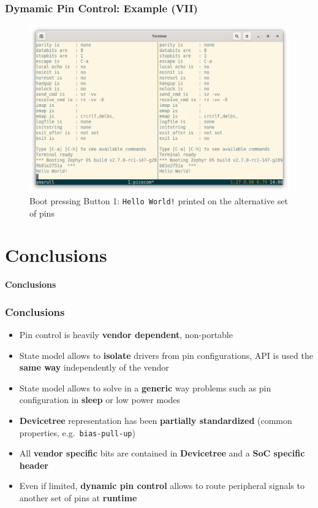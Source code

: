 \documentclass[handout]{beamer}
\begin{document}
\begin{frame}
  \frametitle{Dymamic Pin Control: Example (VII)}

  \begin{figure}
    \centering
    \includegraphics[scale=0.2]{terminals-alt.png}
    \caption{Boot pressing Button 1: \texttt{Hello World!} printed on
      the alternative set of pins}
  \end{figure}
\end{frame}


\section{Conclusions}

\begin{frame}
  \begin{center}
    \Huge
    \textbf{Conclusions}
  \end{center}
\end{frame}

\begin{frame}
  \frametitle{Conclusions}

  \begin{itemize}
    \item<1-> Pin control is heavily \textbf{vendor dependent}, non-portable
    \item<2-> State model allows to \textbf{isolate} drivers from pin
          configurations, API is used the \textbf{same way} independently of the
          vendor
    \item<3-> State model allows to solve in a \textbf{generic} way problems
          such as pin configuration in \textbf{sleep} or low power modes
    \item<4-> \textbf{Devicetree} representation has been
          \textbf{partially standardized} (common properties,
          e.g.\ \texttt{bias-pull-up})
    \item<5-> All \textbf{vendor specific} bits are contained in
          \textbf{Devicetree} and a \textbf{SoC specific header}
    \item<6-> Even if limited, \textbf{dynamic pin control} allows to route
          peripheral signals to another set of pins at \textbf{runtime}
  \end{itemize}
\end{frame}
\end{document}
